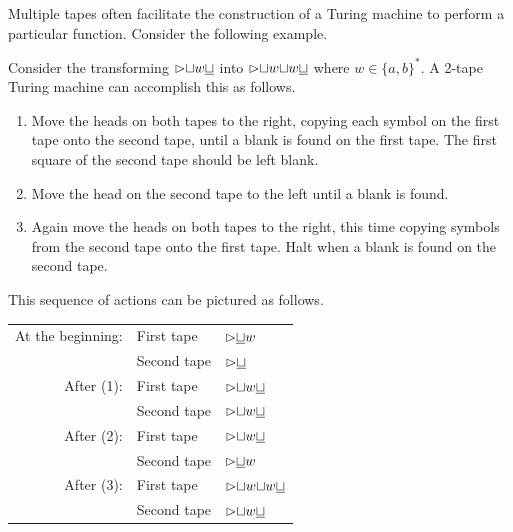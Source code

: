 Multiple tapes often facilitate the construction of a Turing machine to perform a particular function. Consider the following example.
\begin{example}{}
  Consider the transforming ${\vartriangleright}{\sqcup}w{\underline{\sqcup}}$ into ${\vartriangleright}{\sqcup}w{\sqcup}w{\underline{\sqcup}}$ where $w \in \{ a, b \}^*$. A 2-tape Turing machine can accomplish this as follows.

\vspace*{\fill}
\columnbreak

  \begin{enumerate}
    \item Move the heads on both tapes to the right, copying each symbol on the first tape onto the second tape, until a blank is found on the first tape. The first square of the second tape should be left blank.
    \item Move the head on the second tape to the left until a blank is found.
    \item Again move the heads on both tapes to the right, this time copying symbols from the second tape onto the first tape. Halt when a blank is found on the second tape.
  \end{enumerate}
  This sequence of actions can be pictured as follows. 
  \begin{table}[H]
    \centering
    \begin{tabular}{rll}
      At the beginning: & First tape  & ${\vartriangleright}{\underline{\sqcup}}w$                   \\
                        & Second tape & ${\vartriangleright}{\underline{\sqcup}}$                    \\
      After (1):        & First tape  & ${\vartriangleright}{\sqcup}w{\underline{\sqcup}}$           \\
                        & Second tape & ${\vartriangleright}{\sqcup}w{\underline{\sqcup}}$           \\
      After (2):        & First tape  & ${\vartriangleright}{\sqcup}w{\underline{\sqcup}}$           \\
                        & Second tape & ${\vartriangleright}{\underline{\sqcup}}w$                   \\
      After (3):        & First tape  & ${\vartriangleright}{\sqcup}w{\sqcup}w{\underline{\sqcup}}$  \\
                        & Second tape & ${\vartriangleright}{\sqcup}w{\underline{\sqcup}}$
    \end{tabular}
  \end{table}
\end{example}


